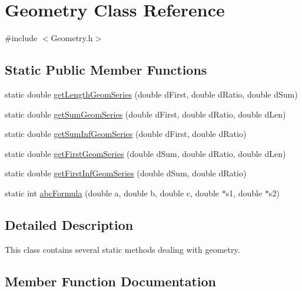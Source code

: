 \hypertarget{classGeometry}{}\section{Geometry Class Reference}
\label{classGeometry}


{\ttfamily \#include $<$Geometry.\+h$>$}

\subsection*{Static Public Member Functions}
\begin{DoxyCompactItemize}
\item 
static double \hyperlink{classGeometry_ab5a80501e3a82a4228e6fcaab2a11060}{get\+Length\+Geom\+Series} (double d\+First, double d\+Ratio, double d\+Sum)
\item 
static double \hyperlink{classGeometry_a832b8bad1a2112aa0514ea69177c583c}{get\+Sum\+Geom\+Series} (double d\+First, double d\+Ratio, double d\+Len)
\item 
static double \hyperlink{classGeometry_ad4f65e9f09df349de24edbcfaf8bdc23}{get\+Sum\+Inf\+Geom\+Series} (double d\+First, double d\+Ratio)
\item 
static double \hyperlink{classGeometry_a3ab5fec3f0eda4173497a8febfeaf5b8}{get\+First\+Geom\+Series} (double d\+Sum, double d\+Ratio, double d\+Len)
\item 
static double \hyperlink{classGeometry_ae0b007214c9b619a06232395631e075f}{get\+First\+Inf\+Geom\+Series} (double d\+Sum, double d\+Ratio)
\item 
static int \hyperlink{classGeometry_a972bd2ba8dea1c4d9c8fce4dcb9ff916}{abc\+Formula} (double a, double b, double c, double $\ast$s1, double $\ast$s2)
\end{DoxyCompactItemize}


\subsection{Detailed Description}
This class contains several static methods dealing with geometry. 

\subsection{Member Function Documentation}
